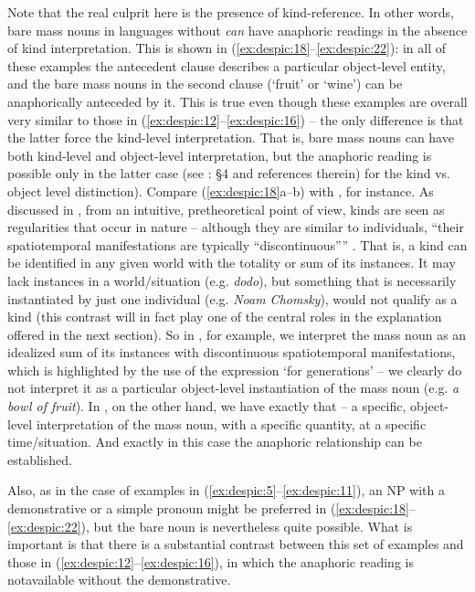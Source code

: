 \documentclass[output=paper,
modfonts
]{langscibook}
\begin{document}
	Note that the real culprit here is the presence of kind-reference. In other
	words, bare mass nouns in languages without  \textit{can} have anaphoric readings in the
	absence of kind interpretation. This is shown in (\ref{ex:despic:18}--\ref{ex:despic:22}): in all of these examples the antecedent
	clause describes a particular object-level entity, and the bare mass nouns in the second clause
	(`fruit' or `wine') can be anaphorically anteceded by it. This is true even though these examples
	are overall very similar to those in (\ref{ex:despic:12}--\ref{ex:despic:16}) -- the only difference is that the latter force the
	kind-level interpretation.\largerpage
	That is, bare mass nouns can have both kind-level and object-level interpretation, but the anaphoric reading is possible only in the latter case (see \citealt{Chierchia1998}: \S4 and references therein) for the kind vs. object level distinction). Compare (\ref{ex:despic:18}a--b) with , for instance. As discussed in \citet{Chierchia1998}, from an intuitive, pretheoretical point of view, kinds are seen as regularities that occur in nature -- although they are similar to individuals, ``their spatiotemporal manifestations are typically ``discontinuous'''' \citep[348]{Chierchia1998}. That is, a kind can be identified in any given world with the totality or sum of its instances. It may lack instances in a world/situation (e.g. \textit{dodo}), but something that is necessarily instantiated by just one individual (e.g. \textit{Noam Chomsky}), would not qualify as a kind (this contrast will in fact play one of the central roles in the explanation offered in the next section). So in , for example, we interpret the mass noun as an idealized sum of its instances with discontinuous spatiotemporal manifestations, which is highlighted by the use of the expression `for generations' -- we clearly do not interpret it as a particular object-level instantiation of the mass noun (e.g. \textit{a bowl of fruit}). In , on the other hand, we have exactly that -- a specific, object-level interpretation of the mass noun, with a specific quantity, at a specific time/situation. And exactly in this case the anaphoric relationship can be established. 
	
	Also, as in the case of examples in (\ref{ex:despic:5}--\ref{ex:despic:11}), an NP with a demonstrative or a simple pronoun might be preferred in (\ref{ex:despic:18}--\ref{ex:despic:22}), but the bare noun is nevertheless quite possible. What is important is that there is a substantial contrast between this set of examples and those in (\ref{ex:despic:12}--\ref{ex:despic:16}), in which the anaphoric reading is not\largerpage available without the demonstrative. 
	
\end{document}
